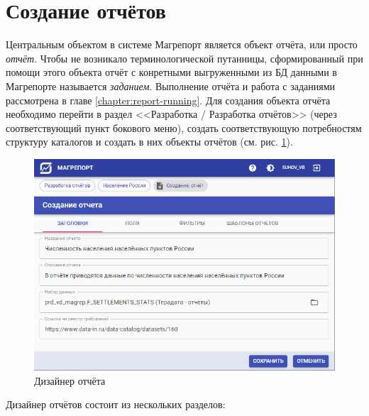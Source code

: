 \documentclass[../user-manual.tex]{subfiles}
\begin{document}
	\section{Создание отчётов}\label{report-developing}
	
	Центральным объектом в системе Магрепорт является объект отчёта, или просто \textit{отчёт}. Чтобы не возникало терминологической путанницы, сформированный при помощи этого объекта отчёт с конретными выгруженными из БД данными в Магрепорте называется \textit{заданием}. Выполнение отчёта и работа с заданиями рассмотрена в главе \ref{chapter:report-running}. Для создания объекта отчёта необходимо перейти в раздел <<Разработка / Разработка отчётов>> (через соответствующий пункт бокового меню), создать соответствующую потребностям структуру каталогов и создать в них объекты отчётов (см. рис. \ref{fig:create-report}).
	
	\begin{figure}[h]
		\centering
		\includegraphics[width=\graphicswidth]{img/5-create-report.png}
		\caption{Дизайнер отчёта}
		\label{fig:create-report}
	\end{figure}

	Дизайнер отчётов состоит из нескольких разделов:
	
\end{document}

